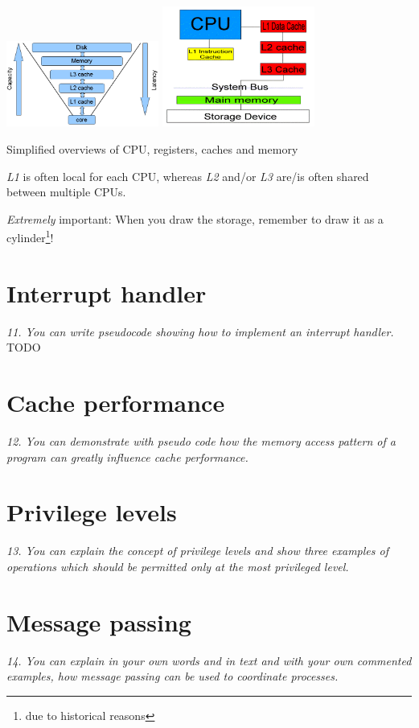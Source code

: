 \documentclass{article}
\begin{document}
\begin{center}
\includegraphics[width=5.0cm]{images/cpu_cache_structure.png}
\includegraphics[width=5.0cm]{images/CPU-Cache-System.png}

Simplified overviews of CPU, registers, caches and memory
\end{center}

\emph{L1} is often local for each CPU, whereas \emph{L2} and/or \emph{L3} are/is often shared between multiple CPUs.

\emph{Extremely} important: When you draw the storage, remember to draw it as a cylinder\footnote{due to historical reasons}!


\section{Interrupt handler}
\emph{11. You can write pseudocode showing how to implement an interrupt handler.}
TODO


\section{Cache performance}
\emph{12. You can demonstrate with pseudo code how the memory access pattern of a program can greatly influence cache performance.}



\section{Privilege levels}
\emph{13. You can explain the concept of privilege levels and show three examples of operations which should be permitted only at the most privileged level.}



\section{Message passing}
\emph{14. You can explain in your own words and in text and with your own commented examples, how message passing can be used to coordinate processes.}

\end{document}
